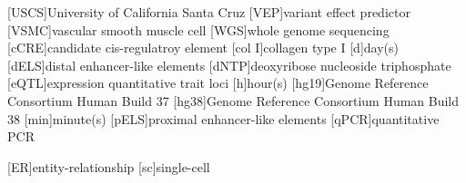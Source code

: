 \begin{acronym}
                                 [USCS]{University of California Santa Cruz}
                                              [VEP]{variant effect predictor}
                                         [VSMC]{vascular smooth muscle cell}
                                               [WGS]{whole genome sequencing}
                                    [cCRE]{candidate cis-regulatroy element}
                                                    [col I]{collagen type I}
                                                                    [d]{day(s)}
                                       [dELS]{distal enhancer-like elements}
                                 [dNTP]{deoxyribose nucleoside triphosphate}
                                  [eQTL]{expression quantitative trait loci}
                                                                   [h]{hour(s)}
                          [hg19]{Genome Reference Consortium Human Build 37}
                          [hg38]{Genome Reference Consortium Human Build 38}
                                                             [min]{minute(s)}
                                     [pELS]{proximal enhancer-like elements}
                                                    [qPCR]{quantitative PCR}

                                                    [ER]{entity-relationship}
                                                             [sc]{single-cell}\end{acronym}
